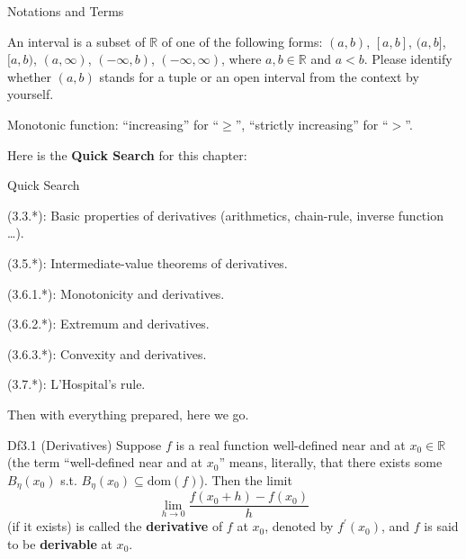 \documentclass{article}
\begin{document}
\begin{Df}{Notations and Terms}
\begin{compactenum}
        \item An interval is a subset of $\mathbb{R}$ of one of the following forms: $(a,b)$, $[a,b]$, $(a,b]$, $[a,b)$, $(a, \infty)$, $(-\infty, b)$, $(-\infty, \infty)$, where $a, b\in\mathbb{R}$ and $a<b$. Please identify whether $(a,b)$ stands for a tuple or an open interval from the context by yourself.
        \item Monotonic function: ``increasing'' for ``$\geq$'', ``strictly increasing'' for ``$>$''.
    \end{compactenum}
\end{Df}

Here is the \textbf{Quick Search} for this chapter:
\begin{Th}{Quick Search}
    \begin{compactdesc}
        \item[] (3.3.*): Basic properties of derivatives (arithmetics, chain-rule, inverse function \dots).
        \item[] (3.5.*): Intermediate-value theorems of derivatives.
        \item[] (3.6.1.*): Monotonicity and derivatives.
        \item[] (3.6.2.*): Extremum and derivatives.
        \item[] (3.6.3.*): Convexity and derivatives.
        \item[] (3.7.*): L'Hospital's rule.
    \end{compactdesc}
\end{Th}

Then with everything prepared, here we go.

\begin{Df}{Df3.1 (Derivatives)}
    Suppose $f$ is a real function well-defined near and at $x_0\in\mathbb{R}$ (the term ``well-defined near and at $x_0$'' means, literally, that there exists some $B_\eta(x_0)$ s.t. $B_\eta(x_0)\subseteq \text{dom}(f)$). Then the limit
    $$ \lim_{h\to 0} \frac{f(x_0+h)-f(x_0)}{h} $$
    (if it exists) is called the \textbf{derivative} of $f$ at $x_0$, denoted by $f^\prime(x_0)$, and $f$ is said to be \textbf{derivable} at $x_0$. 
\end{Df}
\end{document}
